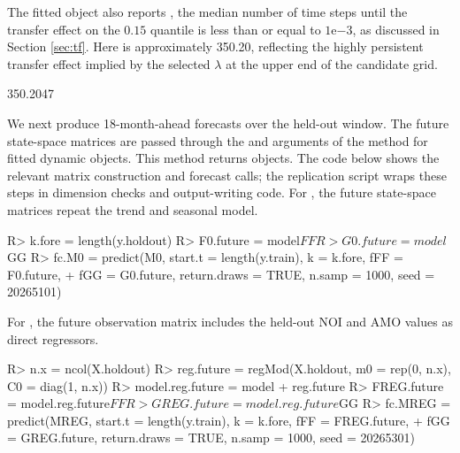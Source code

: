 \documentclass{jss}
\begin{document}
The fitted object also reports , the median number of time steps
until the transfer effect on the \(0.15\) quantile is less than or equal to
\(1\mathrm{e}{-3}\), as discussed in Section \ref{sec:tf}. Here
 is approximately 350.20, reflecting the highly persistent
transfer effect implied by the selected \(\lambda\) at the upper end of the
candidate grid.
\begin{CodeChunk}
\begin{CodeOutput}
[1] 350.2047
\end{CodeOutput}
\end{CodeChunk}

We next produce 18-month-ahead forecasts over the held-out window. The
future state-space matrices are passed through the  and 
arguments of the  method for fitted dynamic objects. This
method returns  objects.
The
code below shows the relevant matrix construction and forecast calls; the
replication script wraps these steps in dimension checks and output-writing
code. For , the future state-space matrices repeat the trend and
seasonal model.

\begin{CodeChunk}
\begin{CodeInput}
R> k.fore = length(y.holdout)
R> F0.future = model$FF
R> G0.future = model$GG
R> fc.M0 = predict(M0, start.t = length(y.train), k = k.fore, fFF = F0.future,
+                  fGG = G0.future, return.draws = TRUE, n.samp = 1000, seed = 20265101)
\end{CodeInput}
\end{CodeChunk}

For , the future observation matrix includes the held-out NOI and AMO values as direct regressors.

\begin{CodeChunk}
\begin{CodeInput}
R> n.x = ncol(X.holdout)
R> reg.future = regMod(X.holdout, m0 = rep(0, n.x), C0 = diag(1, n.x))
R> model.reg.future = model + reg.future
R> FREG.future = model.reg.future$FF
R> GREG.future = model.reg.future$GG
R> fc.MREG = predict(MREG, start.t = length(y.train), k = k.fore, fFF = FREG.future,
+                    fGG = GREG.future, return.draws = TRUE, n.samp = 1000, seed = 20265301)
\end{CodeInput}
\end{CodeChunk}
\end{document}
